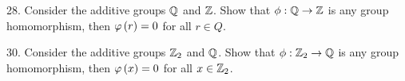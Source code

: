 \begin{mdframed}[style=darkAnswer,frametitle={Joe Starr}]
\end{mdframed}
\newpage
\begin{mdframed}[style=darkQuesion]
  28. Consider the additive groups $\mathbb{Q}$ and $\mathbb{Z}$. Show that $\phi:\mathbb{Q}\to\mathbb{Z}$ is 
  any group homomorphism, then $\varphi\left(r\right)=0$ for all $r\in Q$.
\end{mdframed}
\begin{mdframed}[style=darkAnswer,frametitle={Joe Starr}]
\end{mdframed}
\newpage
\begin{mdframed}[style=darkQuesion]
  30. Consider the additive groups $\mathbb{Z}_{2}$ and $\mathbb{Q}$. Show that $\phi:\mathbb{Z}_{2}\to\mathbb{Q}$
  is any group homomorphism, then $\varphi\left(x\right)=0$ for all $x\in \mathbb{Z}_{2}$.
\end{mdframed}
\begin{mdframed}[style=darkAnswer,frametitle={Joe Starr}]
\end{mdframed}
\newpage